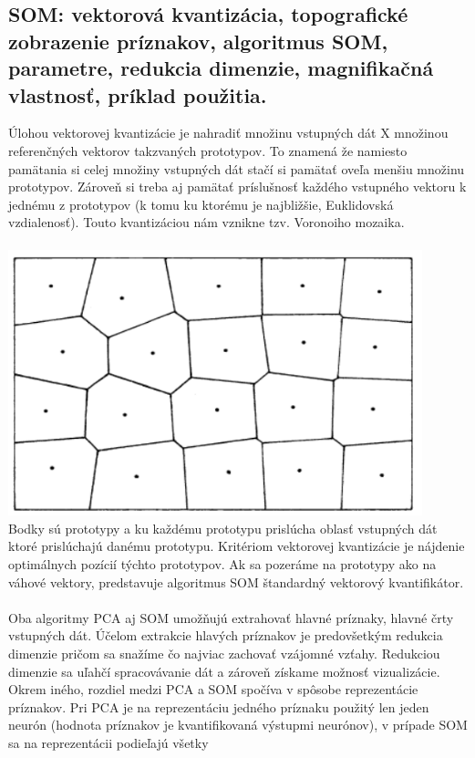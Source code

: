 \documentclass{article}
\numberwithin{equation}{section} %
\begin{document}
\subsection{SOM: vektorová kvantizácia, topografické zobrazenie príznakov, algoritmus SOM, parametre, redukcia dimenzie, magnifikačná vlastnosť, príklad použitia.}
Úlohou vektorovej kvantizácie je nahradiť množinu vstupných dát X množinou referenčných vektorov takzvaných prototypov. To znamená že namiesto pamätania si celej množiny vstupných dát stačí si pamätať oveľa menšiu množinu prototypov. Zároveň si treba aj pamätať príslušnosť každého vstupného vektoru k jednému z prototypov (k tomu ku ktorému je najbližšie, Euklidovská vzdialenosť). Touto kvantizáciou nám vznikne tzv. Voronoiho mozaika.
\\\\
\includegraphics[width=12cm]{imgs/voronoi}\\
Bodky sú prototypy a ku každému prototypu prislúcha oblasť vstupných dát ktoré prislúchajú danému prototypu.
Kritériom vektorovej kvantizácie je nájdenie optimálnych pozícií týchto prototypov. Ak sa pozeráme na prototypy ako na váhové vektory, predstavuje algoritmus SOM štandardný vektorový kvantifikátor.
\\\\
Oba algoritmy PCA aj SOM umožňujú extrahovať hlavné príznaky, hlavné črty vstupných dát. Účelom extrakcie hlavých príznakov je predovšetkým redukcia dimenzie pričom sa snažíme čo najviac zachovať vzájomné vzťahy. Redukciou dimenzie sa uľahčí spracovávanie dát a zároveň získame možnosť vizualizácie.
Okrem iného, rozdiel medzi PCA a SOM spočíva v spôsobe reprezentácie príznakov. Pri
PCA je na reprezentáciu jedného príznaku použitý len jeden neurón (hodnota príznakov je
kvantifikovaná výstupmi neurónov), v prípade SOM sa na reprezentácii podieľajú všetky
\end{document}
